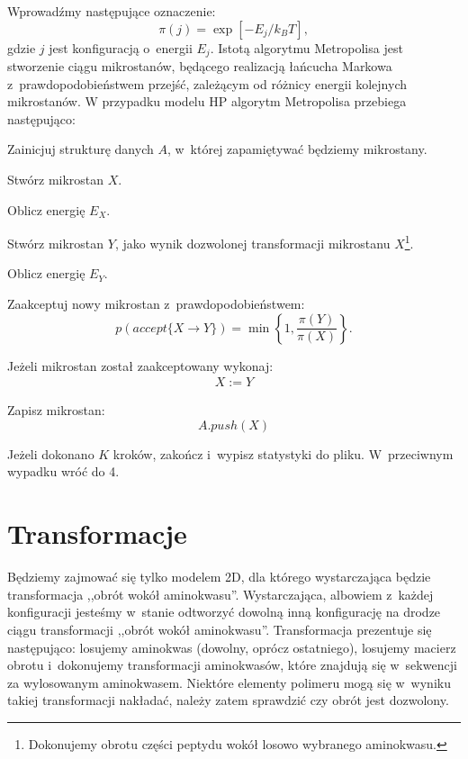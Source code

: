 \documentclass[a4paper,11pt,twoside]{book}
\newenvironment{packed_enum}{
\begin{enumerate}
  \setlength{\itemsep}{1pt}
  \setlength{\parskip}{0pt}
  \setlength{\parsep}{0pt}
}{\end{enumerate}}
\begin{document}
Wprowadźmy następujące oznaczenie:
\begin{displaymath}
\pi(j) = \exp [ -E_j/k_B T ],
\end{displaymath}
gdzie $j$ jest konfiguracją o~energii $E_j$. Istotą algorytmu Metropolisa jest stworzenie
ciągu mikrostanów, będącego realizacją łańcucha Markowa z~prawdopodobieństwem
przejść, zależącym od różnicy energii kolejnych mikrostanów. W przypadku modelu
HP algorytm Metropolisa przebiega następująco:
\begin{packed_enum}
\item Zainicjuj strukturę danych $A$, w~której zapamiętywać będziemy mikrostany.
\item Stwórz mikrostan $X$.
\item Oblicz energię $E_X$.
\item Stwórz mikrostan $Y$, jako wynik dozwolonej transformacji mikrostanu $X$\footnote{Dokonujemy obrotu części peptydu wokół losowo wybranego aminokwasu.}.
\item Oblicz energię $E_Y$.
\item Zaakceptuj nowy mikrostan z~prawdopodobieństwem:
\begin{displaymath}
p(accept\{X \to Y\}) = \min \left \{ 1, \frac{\pi(Y)}{\pi(X)}   \right \}.
\end{displaymath}
\item Jeżeli mikrostan został zaakceptowany wykonaj:
\begin{align}
\nonumber X := Y
\end{align}
\item Zapisz mikrostan:
\begin{displaymath}
A.push(X)
\end{displaymath}
\item Jeżeli dokonano $K$ kroków, zakończ i~wypisz statystyki do pliku. W~przeciwnym wypadku wróć do 4.
\end{packed_enum}
\section{Transformacje}
Będziemy zajmować się tylko modelem 2D, dla którego wystarczająca będzie
transformacja ,,obrót wokół aminokwasu''. Wystarczająca, albowiem z~każdej konfiguracji jesteśmy w~stanie odtworzyć dowolną inną konfigurację na drodze ciągu transformacji ,,obrót wokół aminokwasu''. Transformacja prezentuje się następująco: losujemy aminokwas (dowolny, oprócz ostatniego), losujemy macierz obrotu i~dokonujemy transformacji aminokwasów, które znajdują się w~sekwencji za wylosowanym aminokwasem. Niektóre elementy polimeru mogą się w~wyniku takiej transformacji nakładać, należy zatem sprawdzić czy obrót jest dozwolony.\\
\end{document}
